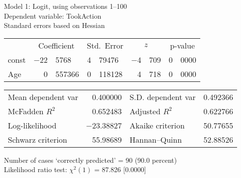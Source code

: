\documentclass[11pt]{article}
\begin{document}
\thispagestyle{empty}

\begin{center}

Model 1: Logit, using observations 1--100\\
Dependent variable: TookAction\\
Standard errors based on Hessian

\vspace{1em}

\begin{tabular}{lr@{.}lr@{.}lr@{.}lr@{.}l}
  &
 \multicolumn{2}{c}{Coefficient} &
  \multicolumn{2}{c}{Std.\ Error} &
   \multicolumn{2}{c}{$z$} &
    \multicolumn{2}{c}{p-value} \\[1ex]
const &
  $-$22&5768 &
    4&79476 &
      $-$4&709 &
        0&0000 \\
Age &
  0&557366 &
    0&118128 &
      4&718 &
        0&0000 \\
\end{tabular}

\vspace{1ex}
\begin{tabular}{lrlr}
Mean dependent var &  0.400000 & S.D. dependent var &  0.492366 \\
McFadden $R^2$ &  0.652483 & Adjusted $R^2$ &  0.622766 \\
Log-likelihood & $-$23.38827 & Akaike criterion &  50.77655 \\
Schwarz criterion &  55.98689 & Hannan--Quinn &  52.88526 \\
\end{tabular}


\vspace{1ex}
\vspace{1em}
\begin{raggedright}
Number of cases `correctly predicted' = 90 (90.0 percent)\\
Likelihood ratio test: $\chi^2(1)$ = 87.826 [0.0000]\\
\end{raggedright}

\end{center}
\end{document}
